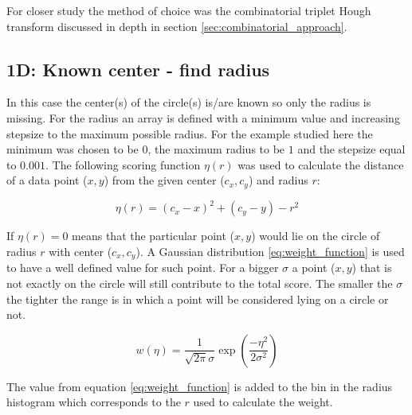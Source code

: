 \documentclass[11pt]{scrreprt}
\begin{document}
For closer study the 
method of choice was the combinatorial triplet Hough transform discussed in depth in section \ref{sec:combinatorial_approach}.

\subsection{1D: Known center - find radius} %
\label{sub:1d_known_center_find_radius}

In this case the center(s) of the circle(s) is/are known so only the radius is missing. For the radius an array is defined with a 
minimum value and increasing stepsize to the maximum possible radius. For the example studied here the minimum was chosen to be $0$, 
the maximum radius to be $1$ and the stepsize equal to $0.001$. The following scoring function $\eta(r)$ was used to calculate the distance
of a data point ($x,y$) from the given center ($c_x, c_y$) and radius $r$:

\begin{equation}
\label{eq:score_function}
  \eta(r) = (c_x - x)^2 + (c_y - y) - r ^ 2
\end{equation}

If $\eta(r)=0$ means that the particular point ($x,y$) would lie on the circle of radius $r$ with center ($c_x, c_y$).
A Gaussian distribution \ref{eq:weight_function} is used to have a well defined value for such point. For a bigger $\sigma$ a point 
($x,y$) that is not exactly on the circle will still contribute to the total score. The smaller the $\sigma$ the tighter the range is
in which a point will be considered lying on a circle or not.

\begin{equation}
\label{eq:weight_function}
  w(\eta) = \frac{1}{\sqrt{2\pi}\sigma}\exp\left( \frac{-\eta^2}{2\sigma^2}\right)
\end{equation}

The value from equation \ref{eq:weight_function} is added to the bin in the radius histogram which corresponds to the $r$ used to
calculate the weight.
\end{document}
